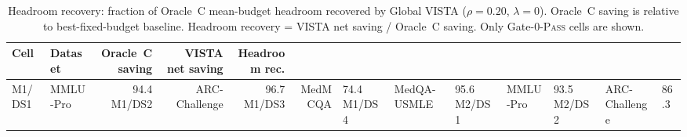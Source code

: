 \begin{table}[t]
\centering
\caption{%
  Headroom recovery: fraction of Oracle~C mean-budget headroom
  recovered by Global VISTA ($\rho=0.20$, $\lambda=0$).
  Oracle~C saving is relative to best-fixed-budget baseline.
  Headroom recovery = VISTA net saving / Oracle~C saving.
  Only Gate-0-\textsc{Pass} cells are shown.
}
\label{tab:vista-headroom}
\begin{tabular}{@{}llrrrr@{}}
\toprule
Cell & Dataset & Oracle~C saving & VISTA net saving & Headroom rec. \\
\midrule
M1/DS1 & MMLU-Pro & 94.4%
M1/DS2 & ARC-Challenge & 96.7%
M1/DS3 & MedMCQA & 74.4%
M1/DS4 & MedQA-USMLE & 95.6%
M2/DS1 & MMLU-Pro & 93.5%
M2/DS2 & ARC-Challenge & 86.3%
\bottomrule
\end{tabular}
\end{table}